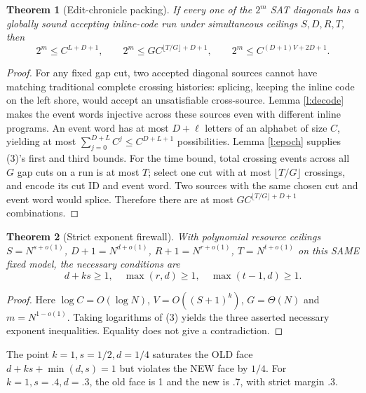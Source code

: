 \documentclass[11pt]{article}
\newtheorem{theorem}{Theorem}
\begin{document}
\begin{theorem}[Edit-chronicle packing]\label{t:packing}
If every one of the $2^m$ SAT diagonals has a globally sound accepting inline-code run under simultaneous ceilings $S,D,R,T$, then
\[
\boxed{2^m\le C^{L+D+1}},\qquad
\boxed{2^m\le G C^{\lfloor T/G\rfloor+D+1}},\qquad
\boxed{2^m\le C^{(D+1)V+2D+1}}.
\tag{3}
\]
\end{theorem}
\begin{proof}
For any fixed gap cut, two accepted diagonal sources cannot have matching traditional complete crossing histories: splicing, keeping the inline code on the left shore, would accept an unsatisfiable cross-source. Lemma \ref{l:decode} makes the event words injective across these sources even with different inline programs. An event word has at most $D+\ell$ letters of an alphabet of size $C$, yielding at most $\sum_{j=0}^{D+L} C^j\le C^{D+L+1}$ possibilities. Lemma \ref{l:epoch} supplies (3)'s first and third bounds. For the time bound, total crossing events across all $G$ gap cuts on a run is at most $T$; select one cut with at most $\lfloor T/G\rfloor$ crossings, and encode its cut ID and event word. Two sources with the same chosen cut and event word would splice. Therefore there are at most $G C^{\lfloor T/G\rfloor+D+1}$ combinations.
\end{proof}
\begin{theorem}[Strict exponent firewall]
With polynomial resource ceilings $S=N^{s+o(1)}$, $D+1=N^{d+o(1)}$, $R+1=N^{r+o(1)}$, $T=N^{t+o(1)}$ on this SAME fixed model, the necessary conditions are
\[
\boxed{d+ks\ge1,\quad \max(r,d)\ge1,\quad \max(t-1,d)\ge1}.
\tag{4}
\]
\end{theorem}
\begin{proof}Here $\log C=O(\log N)$, $V=O((S+1)^k)$, $G=\Theta(N)$ and $m=N^{1-o(1)}$. Taking logarithms of (3) yields the three asserted necessary exponent inequalities. Equality does not give a contradiction.\end{proof}
The point $k=1,s=1/2,d=1/4$ saturates the OLD face $d+ks+\min(d,s)=1$ but violates the NEW face by $1/4$. For $k=1,s=.4,d=.3$, the old face is 1 and the new is .7, with strict margin .3.
\end{document}
